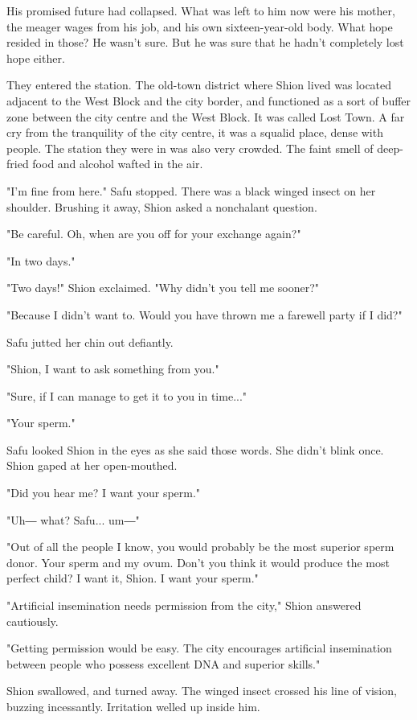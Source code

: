 His promised future had collapsed. What was left to him now were his
mother, the meager wages from his job, and his own sixteen-year-old
body. What hope resided in those? He wasn't sure. But he was sure that
he hadn't completely lost hope either.

They entered the station. The old-town district where Shion lived was
located adjacent to the West Block and the city border, and functioned
as a sort of buffer zone between the city centre and the West Block. It
was called Lost Town. A far cry from the tranquility of the city centre,
it was a squalid place, dense with people. The station they were in was
also very crowded. The faint smell of deep-fried food and alcohol wafted
in the air.

"I'm fine from here." Safu stopped. There was a black winged insect on
her shoulder. Brushing it away, Shion asked a nonchalant question.

"Be careful. Oh, when are you off for your exchange again?"

"In two days."

"Two days!" Shion exclaimed. "Why didn't you tell me sooner?"

"Because I didn't want to. Would you have thrown me a farewell party if
I did?"

Safu jutted her chin out defiantly.

"Shion, I want to ask something from you."

"Sure, if I can manage to get it to you in time..."

"Your sperm."

Safu looked Shion in the eyes as she said those words. She didn't blink
once. Shion gaped at her open-mouthed.

"Did you hear me? I want your sperm."

"Uh― what? Safu... um―"

"Out of all the people I know, you would probably be the most superior
sperm donor. Your sperm and my ovum. Don't you think it would produce
the most perfect child? I want it, Shion. I want your sperm."

"Artificial insemination needs permission from the city," Shion answered
cautiously.

"Getting permission would be easy. The city encourages artificial
insemination between people who possess excellent DNA and superior
skills."

Shion swallowed, and turned away. The winged insect crossed his line of
vision, buzzing incessantly. Irritation welled up inside him.

